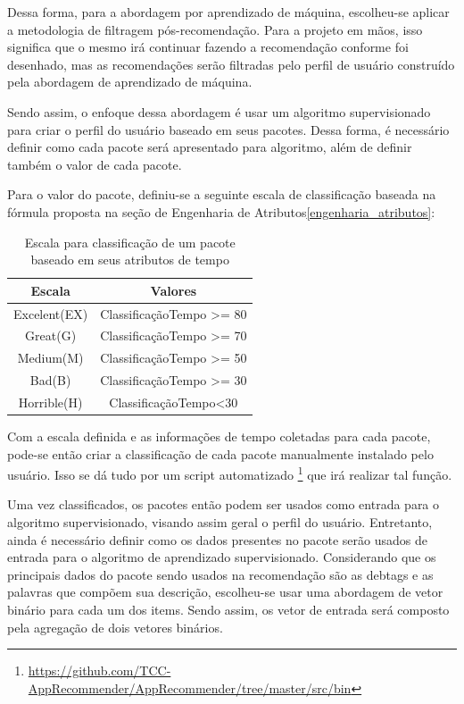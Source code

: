 Dessa forma, para a abordagem por aprendizado de máquina, escolheu-se aplicar a
metodologia de filtragem pós-recomendação. Para a projeto em mãos, isso
significa que o mesmo irá continuar fazendo a recomendação conforme foi
desenhado, mas as recomendações serão filtradas pelo perfil de usuário
construído pela abordagem de aprendizado de máquina.

Sendo assim, o enfoque dessa abordagem é usar um algoritmo supervisionado
para criar o perfil do usuário baseado em seus pacotes. Dessa forma, é
necessário definir como cada pacote será apresentado para algoritmo, além de
definir também o valor de cada pacote.

Para o valor do pacote, definiu-se a seguinte escala de classificação baseada na
fórmula proposta na seção de Engenharia de Atributos\ref{engenharia_atributos}:

\begin{table}[h]
\centering
\begin{tabular}{cc}
\hline
\rowcolor[HTML]{EFEFEF}
{Escala} & {Valores} \\ \hline
{Excelent(EX)}  & ClassificaçãoTempo >= 80                  \\ \hline
{Great(G)}   & ClassificaçãoTempo >= 70                  \\ \hline
{Medium(M)}   & ClassificaçãoTempo >= 50                  \\ \hline
{Bad(B)}   & ClassificaçãoTempo >= 30                  \\ \hline
{Horrible(H)}   &ClassificaçãoTempo<30                   \\ \hline
\end{tabular}
\caption{Escala para classificação de um pacote baseado em seus atributos de tempo}
\label{tab:cwe476-erros}
\end{table}


Com a escala definida e as informações de tempo coletadas para cada pacote,
pode-se então criar a classificação de cada pacote manualmente instalado pelo
usuário.
Isso se dá tudo por um script automatizado \footnote{\url{https://github.com/TCC-AppRecommender/AppRecommender/tree/master/src/bin}}
que irá realizar tal função.

Uma vez classificados, os pacotes então podem ser usados como entrada para o
algoritmo supervisionado, visando assim geral o perfil do usuário.
Entretanto, ainda é necessário definir como os dados presentes no pacote serão usados de entrada para o
algoritmo de aprendizado supervisionado. Considerando que os principais dados do pacote sendo usados na
recomendação são as debtags e as palavras que compõem sua descrição, escolheu-se usar uma abordagem de
vetor binário para cada um dos items. Sendo assim, os vetor de entrada será composto pela agregação de dois vetores
binários.


